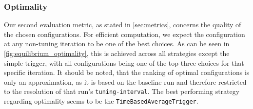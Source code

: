 




\subsubsection{Optimality}
Our second evaluation metric, as stated in \autoref{sec:metrics}, concerns the quality of the chosen configurations. For efficient computation, we expect the configuration at any non-tuning iteration to be one of the best choices. As can be seen in \autoref{fig:equilibrium_optimality}, this is achieved across all strategies except the simple trigger, with all configurations being one of the top three choices for that specific iteration. It should be noted, that the ranking of optimal configurations is only an approximation, as it is based on the baseline run and therefore restricted to the resolution of that run's \texttt{tuning-interval}. The best performing strategy regarding optimality seems to be  the  \texttt{TimeBasedAverageTrigger}.

